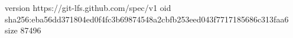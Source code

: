 version https://git-lfs.github.com/spec/v1
oid sha256:eba56dd371804ed0f4fc3b69874548a2cbfb253eed043f7717185686c313faa6
size 87496
